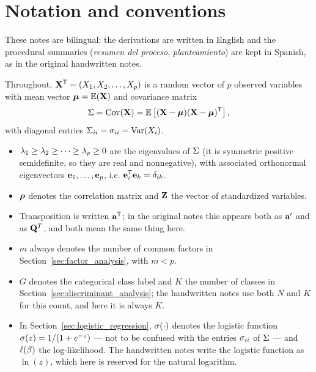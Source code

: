 \section{Notation and conventions}
\label{sec:notation}

These notes are bilingual: the derivations are written in English and the
procedural summaries (\emph{resumen del proceso}, \emph{planteamiento}) are kept
in Spanish, as in the original handwritten notes.

Throughout, $\mathbf{X}^{\mathsf{T}}=(X_1,X_2,\dots,X_p)$ is a random vector of $p$ observed
variables with mean vector $\boldsymbol{\mu}=\mathbb{E}(\mathbf{X})$ and covariance matrix
\[
  \Sigma=\operatorname{Cov}(\mathbf{X})=\mathbb{E}\left[ (\mathbf{X}-\boldsymbol{\mu})(\mathbf{X}-\boldsymbol{\mu})^{\mathsf{T}} \right],
\]
with diagonal entries $\Sigma_{ii}=\sigma_{ii}=\operatorname{Var}(X_i)$.

\begin{itemize}
  \item $\lambda_1\ge\lambda_2\ge\dots\ge\lambda_p\ge 0$ are the eigenvalues of $\Sigma$
        (it is symmetric positive semidefinite, so they are real and nonnegative),
        with associated orthonormal eigenvectors $\mathbf{e}_1,\dots,\mathbf{e}_p$, i.e.
        $\mathbf{e}_i^{\mathsf{T}}\mathbf{e}_k=\delta_{ik}$.
  \item $\boldsymbol{\rho}$ denotes the correlation matrix and $\mathbf{Z}$ the vector of
        standardized variables.
  \item Transposition is written $\mathbf{a}^{\mathsf{T}}$; in the original notes this appears
        both as $\mathbf{a}'$ and as $\mathbf{Q}^{T}$, and both mean the same thing here.
  \item $m$ always denotes the number of common factors in
        Section~\ref{sec:factor_analysis}, with $m<p$.
  \item $G$ denotes the categorical class label and $K$ the number of classes in
        Section~\ref{sec:discriminant_analysis}; the handwritten notes use both
        $N$ and $K$ for this count, and here it is always $K$.
  \item In Section~\ref{sec:logistic_regression}, $\sigma(\cdot)$ denotes the
        logistic function $\sigma(z)=1/(1+e^{-z})$ --- not to be confused with the
        entries $\sigma_{ii}$ of $\Sigma$ --- and $\ell(\beta)$ the log-likelihood.
        The handwritten notes write the logistic function as $\ln(z)$, which
        here is reserved for the natural logarithm.
\end{itemize}
